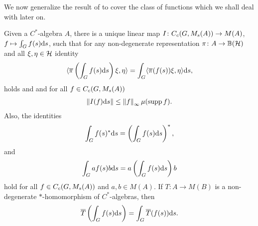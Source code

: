 We now generalize the result of  to cover the class of functions which we shall deal with later on.
\begin{theorem}
Given a $C^*$-algebra $A$, there is a unique linear map $I\colon C_c(G,M_s(A)) \to M(A)$, $f \mapsto \int_G f(s) \mathrm{d} s$, such that for any non-degenerate representation $\pi \colon A \to \mathbb{B}(\mathcal{H})$ and all $\xi, \eta \in \mathcal{H}$ identity
\begin{align}
	\langle \overline \pi \left( \int_G f(s) \mathrm{d} s \right) \xi , \eta \rangle = \int_{G} \langle \overline \pi(f(s)) \xi , \eta \rangle \mathrm{d} s,
	\label{mult:1.35}
\end{align}
holds and and for all $f \in C_c(G,M_s(A))$
\begin{align}
	\left\lVert I(f) \mathrm{d} s \right\rVert \leq \left\lVert f \right\rVert _{ \infty} \mu(\operatorname{supp} f ).
\end{align}
Also, the identities
\begin{align}
	\int_G f(s) ^* \mathrm{d} s = \left( \int_G f(s) \mathrm{d} s \right)^*,
\end{align}
and
\begin{align}
	\int_G a f(s) b \mathrm{d} s = a \left( \int_G f(s) \mathrm{d} s  \right) b
\end{align}
hold for all $f \in C_c(G,M_s(A))$ and $a,b \in M(A)$. If $T \colon A \to M(B)$ is a non-degenerate $*$-homomorphism of $C^*$-algebras, then
\begin{align}
	\overline T \left( \int_G f(s) \mathrm{d} s\right) = \int_G \overline T (f(s)) \mathrm{d} s.
\end{align}

\label{int:multstrictintegral}
\end{theorem}
